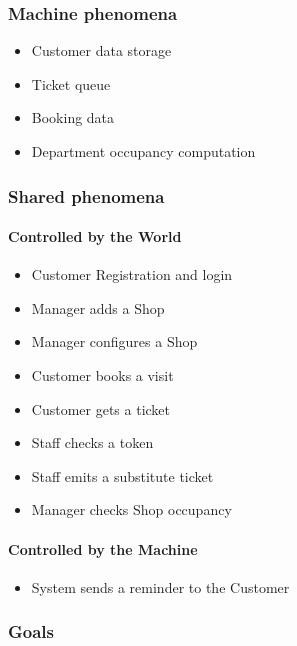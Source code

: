 \subsubsection{Machine phenomena}
\begin{itemize}
    \item Customer data storage
    \item Ticket queue
    \item Booking data
    \item Department occupancy computation
\end{itemize}

\subsubsection{Shared phenomena}

\paragraph{Controlled by the World}
\begin{itemize}
    \item Customer Registration and login
    \item Manager adds a Shop
    \item Manager configures a Shop
    \item Customer books a visit
    \item Customer gets a ticket
    \item Staff checks a token
    \item Staff emits a substitute ticket
    \item Manager checks Shop occupancy
\end{itemize}

\paragraph{Controlled by the Machine}
\begin{itemize}
    \item System sends a reminder to the Customer
\end{itemize}

\subsubsection{Goals}

